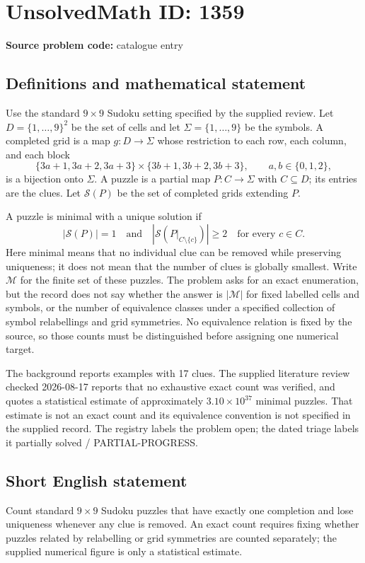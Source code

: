 \documentclass[11pt]{article}
\begin{document}
\section*{UnsolvedMath ID: 1359}
\textbf{Source problem code:} catalogue entry
\subsection{Definitions and mathematical statement}
Use the standard $9\times9$ Sudoku setting specified by the supplied review. Let $D=\{1,\ldots,9\}^2$ be the set of cells and let $\Sigma=\{1,\ldots,9\}$ be the symbols. A completed grid is a map $g:D\to\Sigma$ whose restriction to each row, each column, and each block
\[\{3a+1,3a+2,3a+3\}\times\{3b+1,3b+2,3b+3\},\qquad a,b\in\{0,1,2\},\]
is a bijection onto $\Sigma$. A puzzle is a partial map $P:C\to\Sigma$ with $C\subseteq D$; its entries are the clues. Let $\mathcal S(P)$ be the set of completed grids extending $P$.

A puzzle is minimal with a unique solution if
\[|\mathcal S(P)|=1\quad\text{and}\quad \left|\mathcal S\!\left(P|_{C\setminus\{c\}}\right)\right|\geq2\quad\text{for every }c\in C.\]
Here minimal means that no individual clue can be removed while preserving uniqueness; it does not mean that the number of clues is globally smallest. Write $\mathcal M$ for the finite set of these puzzles. The problem asks for an exact enumeration, but the record does not say whether the answer is $|\mathcal M|$ for fixed labelled cells and symbols, or the number of equivalence classes under a specified collection of symbol relabellings and grid symmetries. No equivalence relation is fixed by the source, so those counts must be distinguished before assigning one numerical target.

The background reports examples with 17 clues. The supplied literature review checked 2026-08-17 reports that no exhaustive exact count was verified, and quotes a statistical estimate of approximately $3.10\times10^{37}$ minimal puzzles. That estimate is not an exact count and its equivalence convention is not specified in the supplied record. The registry labels the problem open; the dated triage labels it partially solved / PARTIAL-PROGRESS.
\subsection{Short English statement}
Count standard $9\times9$ Sudoku puzzles that have exactly one completion and lose uniqueness whenever any clue is removed. An exact count requires fixing whether puzzles related by relabelling or grid symmetries are counted separately; the supplied numerical figure is only a statistical estimate.
\end{document}
